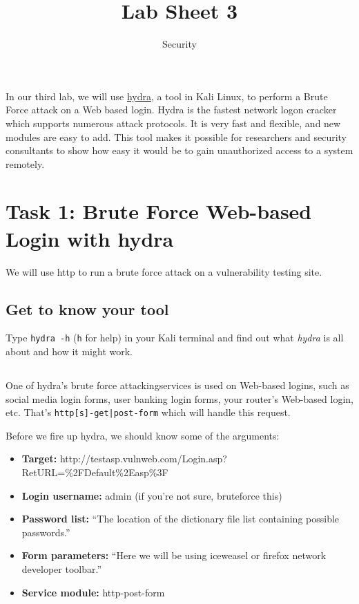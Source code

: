 \documentclass{article}
\title{Lab Sheet 3}
\date{Security}
\begin{document}
\maketitle

In our third lab, we will use \href{https://www.cyberpunk.rs/password-cracker-thc-hydra}{hydra}, a tool in Kali Linux, to perform a Brute Force attack on a Web based login. Hydra is the fastest network logon cracker which supports numerous attack protocols. It is very fast and flexible, and new modules are easy to add. This tool makes it possible for researchers and security consultants to show how easy it would be to gain unauthorized access to a system remotely. 

\section{Task 1: Brute Force Web-based Login with hydra}
We will use http to run a brute force attack on a vulnerability testing site.

\subsection{Get to know your tool}
Type \texttt{hydra -h} (\texttt{h} for help) in your Kali terminal and find out what \textit{hydra} is all about and how it might work.

\subsection{}
One of hydra's brute force attackingservices is used on Web-based logins, such as social media login forms, user banking login forms, your router's Web-based login, etc. That's \texttt{http[s]-{get|post}-form} which will handle this request.

Before we fire up hydra, we should know some of the arguments:
\begin{itemize}
\item \textbf{Target:} http://testasp.vulnweb.com/Login.asp?RetURL=\%2FDefault\%2Easp\%3F
\item \textbf{Login username:} admin (if you're not sure, bruteforce this)
\item \textbf{Password list:} ``The location of the dictionary file list containing possible passwords.''
\item \textbf{Form parameters:} ``Here we will be using iceweasel or firefox network developer toolbar.''
\item \textbf{Service module:} http-post-form
\end{itemize}
\end{document}
